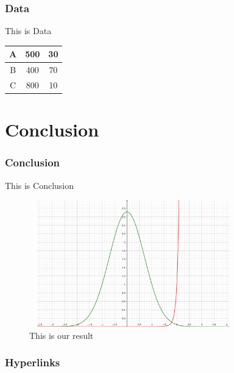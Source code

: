 \documentclass{beamer}
\begin{document}
\begin{frame}\frametitle{Data}\label{data}
This is Data
\begin{table}
\centering
\begin{tabular}{c|c|c}
A & 500 & 30 \\
\hline
B&400&70\\
\hline
C&800&10\\
\hline
\end{tabular}
\end{table}
\end{frame}
\section{Conclusion}

\begin{frame}\frametitle{Conclusion}
This is Conclusion
\begin{figure}
\centering
\includegraphics[width=9cm,height=5.5cm]{plot}
\caption{This is our result}
\end{figure}

\end{frame}

\begin{frame}\frametitle{Hyperlinks}
\hyperlink{outline}{}\\
\hyperlink{intro}{}
\end{frame}
\end{document}
